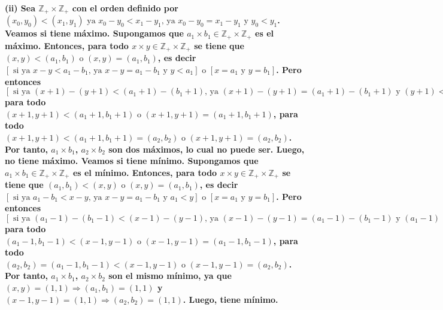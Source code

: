 \documentclass{article}
\begin{document}
\bf (ii) \rm  Sea \(\mathbb{Z}_{+}\times \mathbb{Z}_{+}\) con el orden definido por \((x_0,y_0)<(x_1,y_1) \text{ ya } x_0-y_0<x_1-y_1\text{, ya } x_0-y_0=x_1-y_1 \text{ y } y_0<y_1\). Veamos si tiene máximo. Supongamos que \(a_1\times b_1 \in \mathbb{Z}_{+} \times \mathbb{Z}_{+} \) es el máximo. Entonces, para todo \(x\times y\in \mathbb{Z}_{+}\times \mathbb{Z}_{+}\) se tiene que \((x,y)<(a_1,b_1) \text{ o } (x,y)=(a_1,b_1)\), es decir  \([\text{ si ya } x-y<a_1-b_1\text{, ya } x-y=a_1-b_1 \text{ y } y<a_1] \text{ o } [x=a_1 \text{ y } y=b_1]\). Pero entonces \([\text{ si ya } (x+1)-(y+1)<(a_1+1)-(b_1+1)\text{, ya } (x+1)-(y+1)=(a_1+1)-(b_1+1) \text{ y } (y+1)<(a_1+1)] \text{ o } [(x+1)=(a_1+1) \text{ y } (y+1)=(b_1+1)]\) para todo \((x+1,y+1)<(a_1+1,b_1+1) \text{ o } (x+1,y+1)=(a_1+1,b_1+1)\), para todo \((x+1,y+1)<(a_1+1,b_1+1)=(a_2,b_2) \text{ o } (x+1,y+1)=(a_2,b_2)\). Por tanto, \(a_1 \times b_1\), \(a_2\times b_2\) son dos máximos, lo cual no puede ser. Luego, no tiene máximo. Veamos si tiene mínimo. Supongamos que \(a_1\times b_1 \in \mathbb{Z}_{+} \times \mathbb{Z}_{+} \) es el mínimo. Entonces, para todo \(x\times y\in \mathbb{Z}_{+}\times \mathbb{Z}_{+}\) se tiene que \((a_1,b_1)<(x,y) \text{ o } (x,y)=(a_1,b_1)\), es decir  \([\text{ si ya } a_1-b_1<x-y\text{, ya } x-y=a_1-b_1 \text{ y } a_1<y] \text{ o } [x=a_1 \text{ y } y=b_1]\). Pero entonces \([\text{ si ya } (a_1-1)-(b_1-1)<(x-1)-(y-1)\text{, ya } (x-1)-(y-1)=(a_1-1)-(b_1-1) \text{ y } (a_1-1)<(y-1)] \text{ o } [(x-1)=(a_1-1) \text{ y } (y-1)=(b_1-1)]\) para todo \((a_1-1,b_1-1)<(x-1,y-1) \text{ o } (x-1,y-1)=(a_1-1,b_1-1)\), para todo \((a_2,b_2)=(a_1-1,b_1-1)<(x-1,y-1)\text{ o } (x-1,y-1)=(a_2,b_2)\). Por tanto, \(a_1 \times b_1\), \(a_2\times b_2\) son el mismo mínimo, ya que \((x,y)=(1,1)\Rightarrow (a_1,b_1)=(1,1)\) y \((x-1,y-1)=(1,1)\Rightarrow (a_2,b_2)=(1,1)\). Luego, tiene mínimo.
\newline
\end{document}

